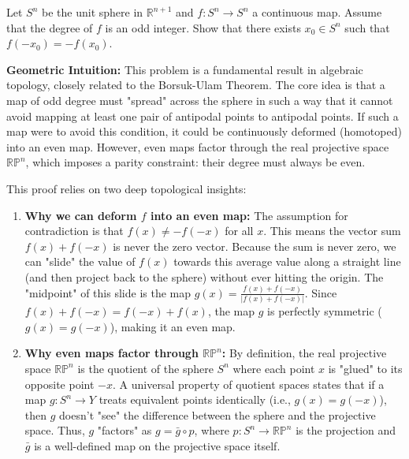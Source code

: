 \clearpage

\begin{exercise}
\label{geometry:2012:10}
Let $S^{n}$ be the unit sphere in $\mathbb{R}^{n+1}$ and $f : S^{n} \to S^{n}$ a continuous map. Assume that the degree of $f$ is an odd integer. Show that there exists $x_{0} \in S^{n}$ such that $f(-x_{0}) = -f(x_{0})$.
\end{exercise}

\begin{solution}
\textbf{Geometric Intuition:} This problem is a fundamental result in algebraic topology, closely related to the Borsuk-Ulam Theorem. The core idea is that a map of odd degree must "spread" across the sphere in such a way that it cannot avoid mapping at least one pair of antipodal points to antipodal points. If such a map were to avoid this condition, it could be continuously deformed (homotoped) into an even map. However, even maps factor through the real projective space $\mathbb{RP}^n$, which imposes a parity constraint: their degree must always be even.

\begin{remark}
This proof relies on two deep topological insights:
\begin{enumerate}
    \item \textbf{Why we can deform $f$ into an even map:} The assumption for contradiction is that $f(x) \neq -f(-x)$ for all $x$. This means the vector sum $f(x) + f(-x)$ is never the zero vector. Because the sum is never zero, we can "slide" the value of $f(x)$ towards this average value along a straight line (and then project back to the sphere) without ever hitting the origin. The "midpoint" of this slide is the map $g(x) = \frac{f(x) + f(-x)}{|f(x) + f(-x)|}$. Since $f(x) + f(-x) = f(-x) + f(x)$, the map $g$ is perfectly symmetric ($g(x) = g(-x)$), making it an even map.
    \item \textbf{Why even maps factor through $\mathbb{RP}^n$:} By definition, the real projective space $\mathbb{RP}^n$ is the quotient of the sphere $S^n$ where each point $x$ is "glued" to its opposite point $-x$. A universal property of quotient spaces states that if a map $g: S^n \to Y$ treats equivalent points identically (i.e., $g(x) = g(-x)$), then $g$ doesn't "see" the difference between the sphere and the projective space. Thus, $g$ "factors" as $g = \bar{g} \circ p$, where $p: S^n \to \mathbb{RP}^n$ is the projection and $\bar{g}$ is a well-defined map on the projective space itself.
\end{enumerate}
\end{remark}


\end{solution}
